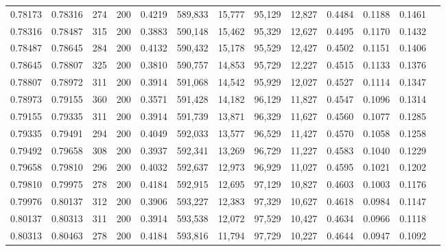 \begin{tabular}{rrrrrrrrrrrrr}
0.78173 & 0.78316 &   274 & 200 &                                     0.4219 & 589,833 &  15,777 &  95,129 &  12,827 & 0.4484 & 0.1188 & 0.1461 \\
0.78316 & 0.78487 &   315 & 200 &                                     0.3883 & 590,148 &  15,462 &  95,329 &  12,627 & 0.4495 & 0.1170 & 0.1432 \\
0.78487 & 0.78645 &   284 & 200 &                                     0.4132 & 590,432 &  15,178 &  95,529 &  12,427 & 0.4502 & 0.1151 & 0.1406 \\
0.78645 & 0.78807 &   325 & 200 &                                     0.3810 & 590,757 &  14,853 &  95,729 &  12,227 & 0.4515 & 0.1133 & 0.1376 \\
0.78807 & 0.78972 &   311 & 200 &                                     0.3914 & 591,068 &  14,542 &  95,929 &  12,027 & 0.4527 & 0.1114 & 0.1347 \\
0.78973 & 0.79155 &   360 & 200 &                                     0.3571 & 591,428 &  14,182 &  96,129 &  11,827 & 0.4547 & 0.1096 & 0.1314 \\
0.79155 & 0.79335 &   311 & 200 &                                     0.3914 & 591,739 &  13,871 &  96,329 &  11,627 & 0.4560 & 0.1077 & 0.1285 \\
0.79335 & 0.79491 &   294 & 200 &                                     0.4049 & 592,033 &  13,577 &  96,529 &  11,427 & 0.4570 & 0.1058 & 0.1258 \\
0.79492 & 0.79658 &   308 & 200 &                                     0.3937 & 592,341 &  13,269 &  96,729 &  11,227 & 0.4583 & 0.1040 & 0.1229 \\
0.79658 & 0.79810 &   296 & 200 &                                     0.4032 & 592,637 &  12,973 &  96,929 &  11,027 & 0.4595 & 0.1021 & 0.1202 \\
0.79810 & 0.79975 &   278 & 200 &                                     0.4184 & 592,915 &  12,695 &  97,129 &  10,827 & 0.4603 & 0.1003 & 0.1176 \\
0.79976 & 0.80137 &   312 & 200 &                                     0.3906 & 593,227 &  12,383 &  97,329 &  10,627 & 0.4618 & 0.0984 & 0.1147 \\
0.80137 & 0.80313 &   311 & 200 &                                     0.3914 & 593,538 &  12,072 &  97,529 &  10,427 & 0.4634 & 0.0966 & 0.1118 \\
0.80313 & 0.80463 &   278 & 200 &                                     0.4184 & 593,816 &  11,794 &  97,729 &  10,227 & 0.4644 & 0.0947 & 0.1092 \\

\end{tabular}
